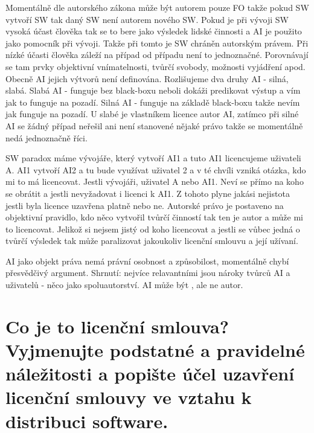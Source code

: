 \documentclass[12pt,a4paper,czech]{article}
\newcommand{\nadpis}[1]{{\section{#1}}}
\begin{document}
Momentálně dle autorského zákona může být autorem pouze FO takže pokud SW vytvoří SW tak daný SW není autorem nového SW. Pokud je při vývoji SW vysoká účast člověka tak se to bere jako výsledek lidské činnosti a AI je použito jako pomocník při vývoji. Takže při tomto je SW chráněn autorským právem. Při nízké účasti člověka záleží na případ od případu není to jednoznačné. Porovnávají se tam prvky objektivní vnímatelnosti, tvůrčí svobody, možnosti vyjádření apod. Obecně AI jejich výtvorů není definována. Rozlišujeme dva druhy AI - silná, slabá. Slabá AI - funguje bez black-boxu neboli dokáži predikovat výstup a vím jak to funguje na pozadí. Silná AI - funguje na základě black-boxu takže nevím jak funguje na pozadí. U slabé je vlastníkem licence autor AI, zatímco při silné AI se žádný případ neřešil ani není stanovené nějaké právo takže se momentálně nedá jednoznačně říci.

SW paradox máme vývojáře, který vytvoří AI1 a tuto AI1 licencujeme uživateli A. AI1 vytvoří AI2 a tu bude využívat uživatel 2 a v té chvíli vzniká otázka, kdo mi to má licencovat. Jestli vývojáři, uživatel A nebo AI1. Neví se přímo na koho se obrátit a jestli nevyžadovat i licenci k AI1. Z tohoto plyne jakási nejistota jestli byla licence uzavřena platně nebo ne. Autorské právo je postaveno na objektivní pravidlo, kdo něco vytvořil tvůrčí činností tak ten je autor a může mi to licencovat. Jelikož si nejsem jistý od koho licencovat a jestli se vůbec jedná o tvůrčí výsledek tak může paralizovat jakoukoliv licenční smlouvu a její užívaní.

AI jako objekt práva nemá právní osobnost a způsobilost, momentálně chybí přesvědčivý argument. 
Shrnutí: nejvíce relavantními jsou nároky tvůrců AI a uživatelů - něco jako spoluautorství. AI může být , ale ne autor.

\newpage
\nadpis{Co je to licenční smlouva? Vyjmenujte podstatné a pravidelné náležitosti a popište účel uzavření licenční smlouvy ve vztahu k distribuci software.}
\end{document}
